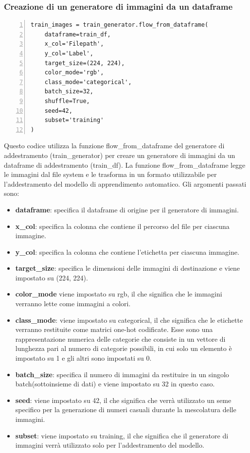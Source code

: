 \documentclass[a4paper,final,12pt]{report}
\begin{document}
\subsubsection{Creazione di un generatore di immagini da un dataframe}
\begin{lstlisting}[caption={Creazione del generatore di immagini da un dataframe di addestramento.}, label={lst:Generatore_di_immagini}, breaklines, escapechar=`\%, frame=lines, basicstyle=\small\ttfamily, keepspaces=true, numbers=left]
train_images = train_generator.flow_from_dataframe(
    dataframe=train_df,
    x_col='Filepath',
    y_col='Label',
    target_size=(224, 224),
    color_mode='rgb',
    class_mode='categorical',
    batch_size=32,
    shuffle=True,
    seed=42,
    subset='training'
)
\end{lstlisting}
Questo codice utilizza la funzione flow\_from\_dataframe del generatore di addestramento (train\_generator) per creare un generatore di immagini da un dataframe di addestramento (train\_df). La funzione flow\_from\_dataframe legge le immagini dal file system e le trasforma in un formato utilizzabile per l'addestramento del modello di apprendimento automatico. Gli argomenti passati sono:
\begin{itemize}
    \item \textbf{dataframe}: specifica il dataframe di origine per il generatore di immagini.
    \item \textbf{x\_col}: specifica la colonna che contiene il percorso del file per ciascuna immagine.
    \item \textbf{y\_col}: specifica la colonna che contiene l'etichetta per ciascuna immagine.
    \item \textbf{target\_size}: specifica le dimensioni delle immagini di destinazione e viene impostato su (224, 224).
    \item \textbf{color\_mode} viene impostato su rgb, il che significa che le immagini verranno lette come immagini a colori.
    \item \textbf{class\_mode}: viene impostato su categorical, il che significa che le etichette verranno restituite come matrici one-hot codificate. Esse sono una rappresentazione numerica delle categorie che consiste in un vettore di lunghezza pari al numero di categorie possibili, in cui solo un elemento è impostato su 1 e gli altri sono impostati su 0.
    \item \textbf{batch\_size}: specifica il numero di immagini da restituire in un singolo batch(sottoinsieme di dati) e viene impostato su 32 in questo caso.
    \item \textbf{seed}: viene impostato su 42, il che significa che verrà utilizzato un seme specifico per la generazione di numeri casuali durante la mescolatura delle immagini.
     \item \textbf{subset}: viene impostato su training, il che significa che il generatore di immagini verrà utilizzato solo per l'addestramento del modello.
\end{itemize}
\end{document}
